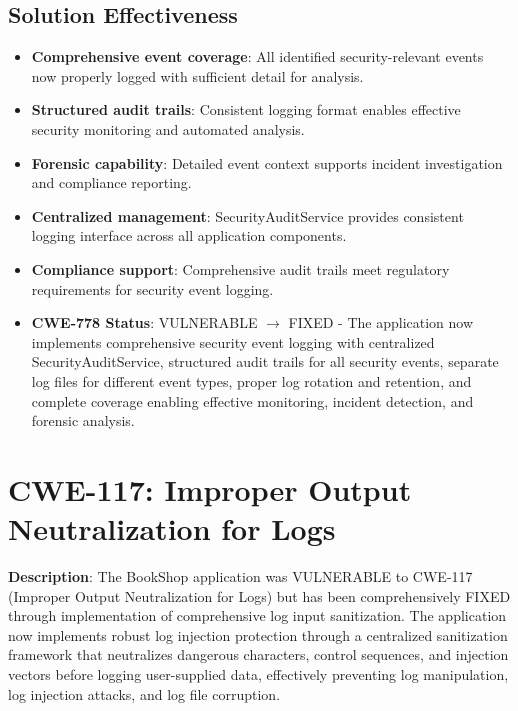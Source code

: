 \documentclass[]{UCD_CS_FYP_Report}
\begin{document}
\subsection{Solution Effectiveness}
\begin{itemize}
	\item \textbf{Comprehensive event coverage}: All identified security-relevant events now properly logged with sufficient detail for analysis.
	\item \textbf{Structured audit trails}: Consistent logging format enables effective security monitoring and automated analysis.
	\item \textbf{Forensic capability}: Detailed event context supports incident investigation and compliance reporting.
	\item \textbf{Centralized management}: SecurityAuditService provides consistent logging interface across all application components.
	\item \textbf{Compliance support}: Comprehensive audit trails meet regulatory requirements for security event logging.
\end{itemize}

\begin{itemize}
	\item \textbf{CWE-778 Status}: VULNERABLE $\rightarrow$ FIXED - The application now implements comprehensive security event logging with centralized SecurityAuditService, structured audit trails for all security events, separate log files for different event types, proper log rotation and retention, and complete coverage enabling effective monitoring, incident detection, and forensic analysis.
\end{itemize}


\section{CWE-117: Improper Output Neutralization for Logs}

\textbf{Description}: The BookShop application was VULNERABLE to CWE-117 (Improper Output Neutralization for Logs) but has been comprehensively FIXED through implementation of comprehensive log input sanitization. The application now implements robust log injection protection through a centralized sanitization framework that neutralizes dangerous characters, control sequences, and injection vectors before logging user-supplied data, effectively preventing log manipulation, log injection attacks, and log file corruption.
\end{document}

